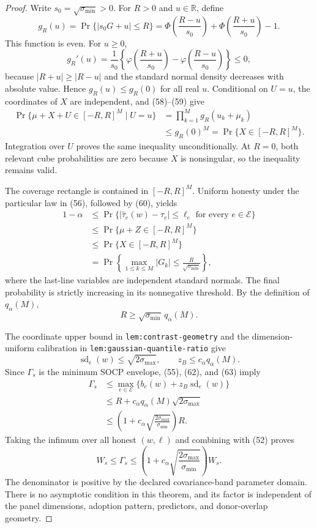 \documentclass{article}
\begin{document}
\begin{proof}
Write \(s_0=\sqrt{\sigma_{\min}}>0\).  For \(R>0\) and \(u\in\mathbb R\),
define
\[
 g_R(u)=\Pr\{|s_0G+u|\leq R\}
 =\Phi\!\left(\frac{R-u}{s_0}\right)
  +\Phi\!\left(\frac{R+u}{s_0}\right)-1. \tag{58}
\]
This function is even.  For \(u\geq0\),
\[
 g_R'(u)=\frac1{s_0}\left\{
 \varphi\!\left(\frac{R+u}{s_0}\right)
 -\varphi\!\left(\frac{R-u}{s_0}\right)\right\}\leq0, \tag{59}
\]
because \(|R+u|\geq|R-u|\) and the standard normal density decreases with
absolute value.  Hence \(g_R(u)\leq g_R(0)\) for all real \(u\).  Conditional
on \(U=u\), the coordinates of \(X\) are independent, and (58)--(59) give
\[
\begin{aligned}
 \Pr\{\mu+X+U\in[-R,R]^M\mid U=u\}
 &=\prod_{k=1}^M g_R(u_k+\mu_k)\\
 &\leq g_R(0)^M
 =\Pr\{X\in[-R,R]^M\}.
\end{aligned} \tag{60}
\]
Integration over \(U\) proves the same inequality unconditionally.  At
\(R=0\), both relevant cube probabilities are zero because \(X\) is
nonsingular, so the inequality remains valid.

The coverage rectangle is contained in \([-R,R]^M\).  Uniform honesty under
the particular law in (56), followed by (60), yields
\[
\begin{aligned}
 1-\alpha
 &\leq\Pr\{|\widehat\tau_e(w)-\tau_e|\leq\ell_e
              \text{ for every }e\in\mathcal E\}\\
 &\leq\Pr\{\mu+Z\in[-R,R]^M\}\\
 &\leq\Pr\{X\in[-R,R]^M\}\\
 &=\Pr\left\{\max_{1\leq k\leq M}|G_k|
       \leq\frac{R}{\sqrt{\sigma_{\min}}}\right\},
\end{aligned} \tag{61}
\]
where the last-line variables are independent standard normals.  The final
probability is strictly increasing in its nonnegative threshold.  By the
definition of \(q_\alpha(M)\),
\[
 R\geq\sqrt{\sigma_{\min}}\,q_\alpha(M). \tag{62}
\]

The coordinate upper bound in \texttt{lem:contrast-geometry} and the
dimension-uniform calibration in \texttt{lem:gaussian-quantile-ratio} give
\[
 \operatorname{sd}_e(w)\leq\sqrt{2\sigma_{\max}},
 \qquad
 z_B\leq c_\alpha q_\alpha(M). \tag{63}
\]
Since \(\Gamma_s\) is the minimum SOCP envelope, (55), (62), and (63) imply
\[
\begin{aligned}
 \Gamma_s
 &\leq\max_{e\in\mathcal E}
       \{b_e(w)+z_B\operatorname{sd}_e(w)\}\\
 &\leq R+c_\alpha q_\alpha(M)\sqrt{2\sigma_{\max}}\\
 &\leq\left(1+c_\alpha
       \sqrt{\frac{2\sigma_{\max}}{\sigma_{\min}}}\right)R.
\end{aligned} \tag{64}
\]
Taking the infimum over all honest \((w,\ell)\) and combining with (52)
proves
\[
 W_s\leq\Gamma_s\leq
 \left(1+c_\alpha
 \sqrt{\frac{2\sigma_{\max}}{\sigma_{\min}}}\right)W_s.
\]
The denominator is positive by the declared covariance-band parameter domain.
There is no asymptotic condition in this theorem, and its factor is independent
of the panel dimensions, adoption pattern, predictors, and donor-overlap
geometry.
\end{proof}
\end{document}
